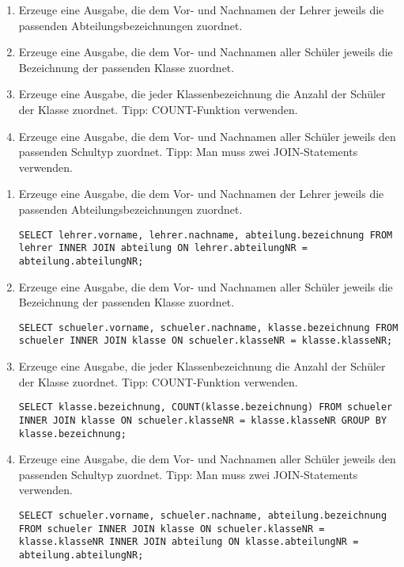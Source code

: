 \begin{Exercise}[title={Bearbeite folgende Aufgaben}, label=Join]
	\begin{enumerate}
		\item Erzeuge eine Ausgabe, die dem Vor- und Nachnamen der Lehrer jeweils die passenden Abteilungsbezeichnungen zuordnet.
		\item Erzeuge eine Ausgabe, die dem Vor- und Nachnamen aller Schüler jeweils die Bezeichnung der passenden Klasse zuordnet.
		\item Erzeuge eine Ausgabe, die jeder Klassenbezeichnung die Anzahl der Schüler der Klasse zuordnet. Tipp: COUNT-Funktion verwenden.
		\item Erzeuge eine Ausgabe, die dem Vor- und Nachnamen aller Schüler jeweils den passenden Schultyp zuordnet. Tipp: Man muss zwei JOIN-Statements verwenden.
	\end{enumerate}
\end{Exercise}
\begin{Answer}[ref=Join]
	\begin{enumerate}
		\item Erzeuge eine Ausgabe, die dem Vor- und Nachnamen der Lehrer jeweils die passenden Abteilungsbezeichnungen zuordnet.

		\lstinline!SELECT lehrer.vorname, lehrer.nachname, abteilung.bezeichnung FROM lehrer INNER JOIN abteilung ON lehrer.abteilungNR = abteilung.abteilungNR;!
		\item Erzeuge eine Ausgabe, die dem Vor- und Nachnamen aller Schüler jeweils die Bezeichnung der passenden Klasse zuordnet.

		\lstinline!SELECT schueler.vorname, schueler.nachname, klasse.bezeichnung FROM schueler INNER JOIN klasse ON schueler.klasseNR = klasse.klasseNR;!
		\item Erzeuge eine Ausgabe, die jeder Klassenbezeichnung die Anzahl der Schüler der Klasse zuordnet. Tipp: COUNT-Funktion verwenden.

		\lstinline!SELECT klasse.bezeichnung, COUNT(klasse.bezeichnung) FROM schueler INNER JOIN klasse ON schueler.klasseNR = klasse.klasseNR GROUP BY klasse.bezeichnung;!
		\item Erzeuge eine Ausgabe, die dem Vor- und Nachnamen aller Schüler jeweils den passenden Schultyp zuordnet. Tipp: Man muss zwei JOIN-Statements verwenden.

		\lstinline!SELECT schueler.vorname, schueler.nachname, abteilung.bezeichnung FROM schueler INNER JOIN klasse ON schueler.klasseNR = klasse.klasseNR INNER JOIN abteilung ON klasse.abteilungNR = abteilung.abteilungNR;!
	\end{enumerate}
\end{Answer}